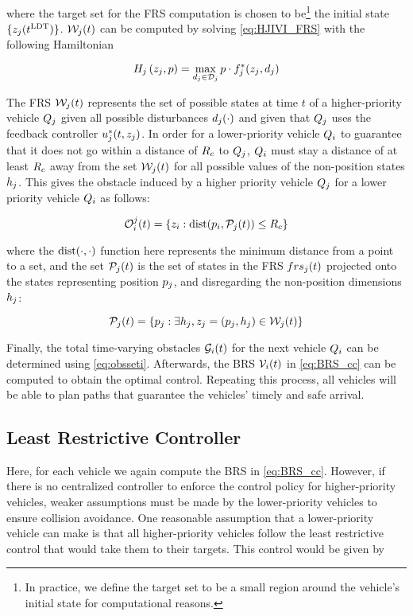 \noindent where the target set for the FRS computation is chosen to be\footnote{In practice, we define the target set to be a small region around the vehicle's initial state for computational reasons.} the initial state $\{z_j(t^\text{LDT})\}$. $\mathcal{W}_j(t)$ can be computed by solving \eqref{eq:HJIVI_FRS} with the following Hamiltonian

\begin{equation}
H_j\left(z_j, p\right) = \max_{d_j \in \mathcal{D}_j} p \cdot f^*_j(z_j, d_j)
\end{equation}

The FRS $\mathcal{W}_j(t)$ represents the set of possible states at time $t$ of a higher-priority vehicle $Q_{j}$ given all possible disturbances $d_j(\cdot)$ and given that $Q_{j}$ uses the feedback controller $u_j^*(t, z_j)$. In order for a lower-priority vehicle $Q_{i}$ to guarantee that it does not go within a distance of $R_c$ to $Q_{j}$, $Q_{i}$ must stay a distance of at least $R_c$ away from the set $\mathcal{W}_j(t)$ for all possible values of the non-position states $h_j$. This gives the obstacle induced by a higher priority vehicle $Q_{j}$ for a lower priority vehicle $Q_{i}$ as follows:

\begin{equation} \label{eq:CCObs}
\ioset_i^j(t) = \{\state_i: \dist(\pos_i, \pfrs_j(t)) \le \rc \}
\end{equation}

\noindent where the $\text{dist}(\cdot, \cdot)$ function here represents the minimum distance from a point to a set, and the set $\mathcal{P}_j(t)$ is the set of states in the FRS $\\frs_j(t)$ projected onto the states representing position $p_j$, and disregarding the non-position dimensions $h_j$:

\begin{equation}
\mathcal{P}_j(t) = \{p_j: \exists h_j, z_j = (p_j, h_j) \in \mathcal{W}_j(t)\}
\end{equation}

Finally, the total time-varying obstacles $\mathcal{G}_i(t)$ for the next vehicle $Q_{i}$ can be determined using \eqref{eq:obsseti}. Afterwards, the BRS $\mathcal{V}_i(t)$ in \eqref{eq:BRS_cc} can be computed to obtain the optimal control. Repeating this process, all vehicles will be able to plan paths that guarantee the vehicles' timely and safe arrival.

\subsection{Least Restrictive Controller}
\label{sec:incomp_LRctrl}
Here, for each vehicle we again compute the BRS in \eqref{eq:BRS_cc}. However, if there is no centralized controller to enforce the control policy for higher-priority vehicles, weaker assumptions must be made by the lower-priority vehicles to ensure collision avoidance. One reasonable assumption that a lower-priority vehicle can make is that all higher-priority vehicles follow the least restrictive control that would take them to their targets. This control would be given by 

